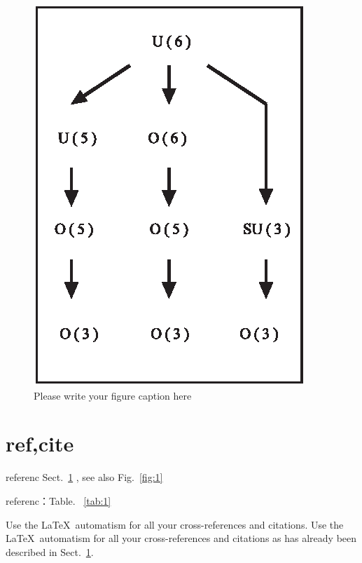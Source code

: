 \begin{figure}[t]
\sidecaption[t]
\includegraphics[scale=.65]{figure}
%
%
\caption{Please write your figure caption here}
\label{fig:2}       %
\end{figure}


\section{ref,cite}
\label{sec:2}

referenc Sect.~\ref{sec:2} , see also Fig.~\ref{fig:1}

referenc：Table. ~\ref{tab:1}

\cite{Lipschutz2007}

\cite[chap.2]{Lipschutz2007}


 Use the \LaTeX\ automatism for all your cross-references and citations.
 Use the \LaTeX\ automatism for all your cross-refer\-ences and citations as has already been described in Sect.~\ref{sec:2}.
%


